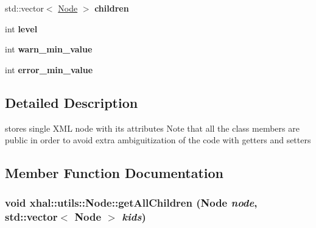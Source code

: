 \begin{DoxyCompactItemize}
\item 
\hypertarget{classxhal_1_1utils_1_1Node_a8084c9cec282213e74e9994f5c10236e}{
std::vector$<$ \hyperlink{classxhal_1_1utils_1_1Node}{Node} $>$ {\bfseries children}}
\label{classxhal_1_1utils_1_1Node_a8084c9cec282213e74e9994f5c10236e}

\item 
\hypertarget{classxhal_1_1utils_1_1Node_a22b99ec36b2549bb444249ee9b6a211f}{
int {\bfseries level}}
\label{classxhal_1_1utils_1_1Node_a22b99ec36b2549bb444249ee9b6a211f}

\item 
\hypertarget{classxhal_1_1utils_1_1Node_a81e1ddfcb833a4eb6052f20d3851ffbc}{
int {\bfseries warn\_\-min\_\-value}}
\label{classxhal_1_1utils_1_1Node_a81e1ddfcb833a4eb6052f20d3851ffbc}

\item 
\hypertarget{classxhal_1_1utils_1_1Node_a69f087548dfd671c648bf3d15dab74df}{
int {\bfseries error\_\-min\_\-value}}
\label{classxhal_1_1utils_1_1Node_a69f087548dfd671c648bf3d15dab74df}

\end{DoxyCompactItemize}


\subsection{Detailed Description}
stores single XML node with its attributes Note that all the class members are public in order to avoid extra ambiguitization of the code with getters and setters 

\subsection{Member Function Documentation}
\hypertarget{classxhal_1_1utils_1_1Node_adf91d1e49a26d7d78880ee8c076b8de5}{
\subsubsection[{getAllChildren}]{\setlength{\rightskip}{0pt plus 5cm}void xhal::utils::Node::getAllChildren ({\bf Node} {\em node}, \/  std::vector$<$ {\bf Node} $>$ {\em kids})}}
\label{classxhal_1_1utils_1_1Node_adf91d1e49a26d7d78880ee8c076b8de5}



